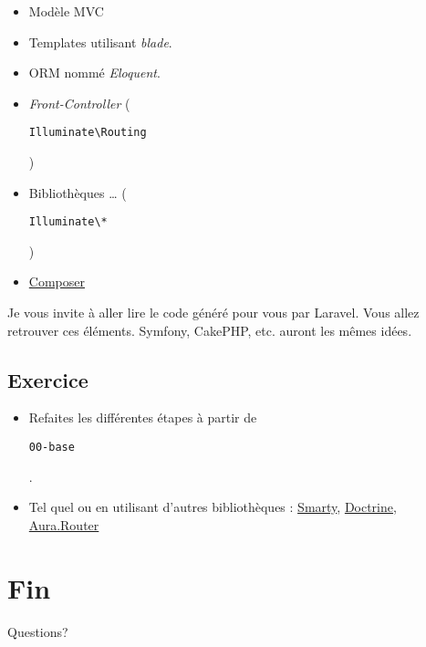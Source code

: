 \begin{itemize}
\tightlist
\item
  Modèle MVC
\item
  Templates utilisant \emph{blade}.
\item
  ORM nommé \emph{Eloquent}.
\item
  \emph{Front-Controller}
  (\begin{otherlanguage}{english}\texttt{Illuminate\textbackslash{}Routing}\end{otherlanguage})
\item
  Bibliothèques \ldots{}
  (\begin{otherlanguage}{english}\texttt{Illuminate\textbackslash{}*}\end{otherlanguage})
\item
  \href{http://getcomposer.org/}{Composer}
\end{itemize}

Je vous invite à aller lire le code généré pour vous par Laravel. Vous
allez retrouver ces éléments. Symfony, CakePHP, etc. auront les mêmes
idées.

\hypertarget{exercice}{%
\subsection{Exercice}\label{exercice}}

\begin{itemize}
\tightlist
\item
  Refaites les différentes étapes à partir de
  \begin{otherlanguage}{english}\texttt{00-base}\end{otherlanguage}.
\item
  Tel quel ou en utilisant d'autres bibliothèques :
  \href{https://github.com/smarty-php/smarty}{Smarty},
  \href{http://docs.doctrine-project.org/en/latest/tutorials/getting-started.html}{Doctrine},
  \href{https://github.com/auraphp/Aura.Router}{Aura.Router}
\end{itemize}

\hypertarget{fin}{%
\section{Fin}\label{fin}}

Questions?

\begin{otherlanguage}{english}

\end{otherlanguage}

